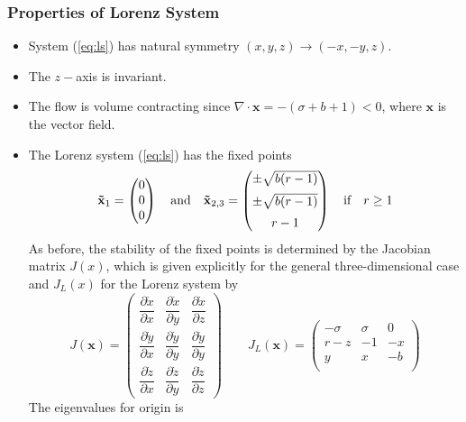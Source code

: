 \subsubsection{Properties of Lorenz System}
\begin{itemize}
	\item System (\ref{eq:ls}) has natural symmetry $(x, y, z)\rightarrow(-x,-y, z)$.
	\item The $z-$axis is invariant.
	\item The flow is volume contracting since $\nabla\cdot\mathbf{x}=-(\sigma+b+1)<0$, where $\mathbf{x}$ is the vector field.
	\item The Lorenz system (\ref{eq:ls}) has the fixed points
	\begin{equation}{\label{eq:sls}}
		\mathbf{\tilde{x}}_1=
		\begin{pmatrix}
			0\\0\\0
		\end{pmatrix}\quad\text{and}\quad
		\mathbf{\tilde{x}}_{2,3}=
		\begin{pmatrix}
			\pm\sqrt{b(r-1)}\\[5pt]
			\pm\sqrt{b(r-1)}\\[5pt]
			r-1
		\end{pmatrix}\quad\text{if}\quad r\geq1
	\end{equation}
	As before, the stability of the fixed points is determined by the Jacobian matrix $J(x)$, which is given explicitly for the general three-dimensional case and $J_L(x)$ for the Lorenz system by
	\begin{equation}
		J(\mathbf{x})=
		\begin{pmatrix}
			\dfrac{\partial\dot{x}}{\partial x}&\dfrac{\partial\dot{x}}{\partial y}&\dfrac{\partial\dot{x}}{\partial z}\\[10pt]
			\dfrac{\partial\dot{y}}{\partial x}&\dfrac{\partial\dot{y}}{\partial y}&\dfrac{\partial\dot{y}}{\partial y}\\[10pt]
			\dfrac{\partial\dot{z}}{\partial x}&\dfrac{\partial\dot{z}}{\partial y}&\dfrac{\partial\dot{z}}{\partial z}
		\end{pmatrix}
		\quad\quad J_L(\mathbf{x})=
		\begin{pmatrix}
			-\sigma&\sigma&0\\
			r-z&-1&-x\\
			y&x&-b\\
		\end{pmatrix}
	\end{equation}
	The eigenvalues for origin is

\end{itemize}
